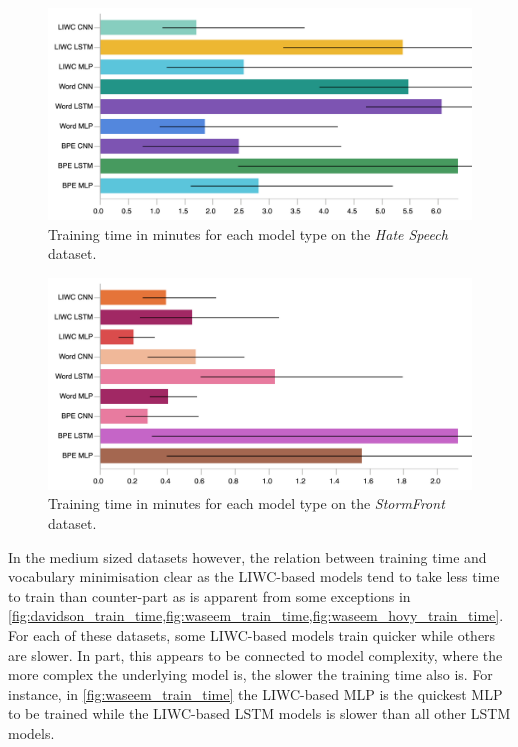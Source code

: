 \begin{figure}[h]
    \centering
    \includegraphics[width=\textwidth]{waseem_hovy_train_time.pdf}
    \caption{Training time in minutes for each model type on the \textit{Hate Speech} dataset.}
    \label{fig:waseem_hovy_train_time}
\end{figure}
\begin{figure}[h]
  \centering
  \includegraphics[width=\textwidth]{garcia_train_time.pdf}
  \caption{Training time in minutes for each model type on the \textit{StormFront} dataset.}
  \label{fig:garcia_train_time}
\end{figure}

In the medium sized datasets however, the relation between training time and vocabulary minimisation clear as the LIWC-based models tend to take less time to train than counter-part as is apparent from some exceptions in \cref{fig:davidson_train_time,fig:waseem_train_time,fig:waseem_hovy_train_time}. 
For each of these datasets, some LIWC-based models train quicker while others are slower. 
In part, this appears to be connected to model complexity, where the more complex the underlying model is, the slower the training time also is. 
For instance, in  \cref{fig:waseem_train_time} the LIWC-based MLP is the quickest MLP to be trained while the LIWC-based LSTM models is slower than all other LSTM models.

